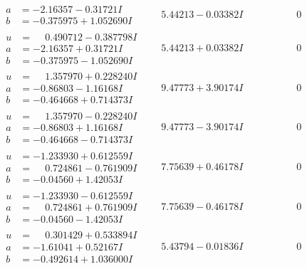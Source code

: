 \documentclass[1p]{elsarticle_modified}
\theoremstyle{definition}
\begin{document}
$$\begin{array}{c|c|c}
\begin{aligned}
a &= -2.16357 - 0.31721 I \\
b &= -0.375975 + 1.052690 I\end{aligned}
 & \phantom{-}5.44213 - 0.03382 I & \phantom{-0.000000 } 0 \\ \hline\begin{aligned}
u &= \phantom{-}0.490712 - 0.387798 I \\
a &= -2.16357 + 0.31721 I \\
b &= -0.375975 - 1.052690 I\end{aligned}
 & \phantom{-}5.44213 + 0.03382 I & \phantom{-0.000000 } 0 \\ \hline\begin{aligned}
u &= \phantom{-}1.357970 + 0.228240 I \\
a &= -0.86803 - 1.16168 I \\
b &= -0.464668 + 0.714373 I\end{aligned}
 & \phantom{-}9.47773 + 3.90174 I & \phantom{-0.000000 } 0 \\ \hline\begin{aligned}
u &= \phantom{-}1.357970 - 0.228240 I \\
a &= -0.86803 + 1.16168 I \\
b &= -0.464668 - 0.714373 I\end{aligned}
 & \phantom{-}9.47773 - 3.90174 I & \phantom{-0.000000 } 0 \\ \hline\begin{aligned}
u &= -1.233930 + 0.612559 I \\
a &= \phantom{-}0.724861 - 0.761909 I \\
b &= -0.04560 + 1.42053 I\end{aligned}
 & \phantom{-}7.75639 + 0.46178 I & \phantom{-0.000000 } 0 \\ \hline\begin{aligned}
u &= -1.233930 - 0.612559 I \\
a &= \phantom{-}0.724861 + 0.761909 I \\
b &= -0.04560 - 1.42053 I\end{aligned}
 & \phantom{-}7.75639 - 0.46178 I & \phantom{-0.000000 } 0 \\ \hline\begin{aligned}
u &= \phantom{-}0.301429 + 0.533894 I \\
a &= -1.61041 + 0.52167 I \\
b &= -0.492614 + 1.036000 I\end{aligned}
 & \phantom{-}5.43794 - 0.01836 I & \phantom{-0.000000 } 0\\

\end{array}$$
\end{document}
